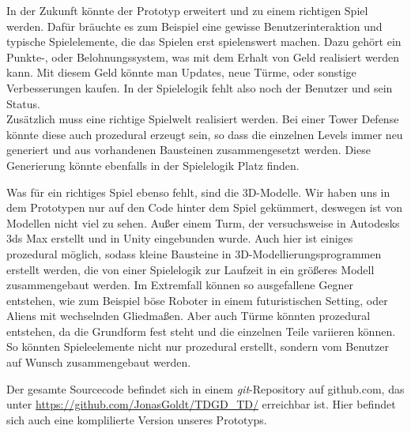 In der Zukunft könnte der Prototyp erweitert und zu einem richtigen Spiel werden. Dafür bräuchte es zum Beispiel eine gewisse Benutzerinteraktion und typische Spielelemente, die das Spielen erst spielenswert machen. Dazu gehört ein Punkte-, oder Belohnungssystem, was mit dem Erhalt von Geld realisiert werden kann. Mit diesem Geld könnte man Updates, neue Türme, oder sonstige Verbesserungen kaufen. In der Spielelogik fehlt also noch der Benutzer und sein Status.\\
Zusätzlich muss eine richtige Spielwelt realisiert werden. Bei einer Tower Defense könnte diese auch prozedural erzeugt sein, so dass die einzelnen Levels immer neu generiert und aus vorhandenen Bausteinen zusammengesetzt werden. Diese Generierung könnte ebenfalls in der Spielelogik Platz finden. 

Was für ein richtiges Spiel ebenso fehlt, sind die 3D-Modelle. Wir haben uns in dem Prototypen nur auf den Code hinter dem Spiel gekümmert, deswegen ist von Modellen nicht viel zu sehen. Außer einem Turm, der versuchsweise in Autodesks 3ds Max erstellt und in Unity eingebunden wurde. Auch hier ist einiges prozedural möglich, sodass kleine Bausteine in 3D-Modellierungsprogrammen erstellt werden, die von einer Spielelogik zur Laufzeit in ein größeres Modell zusammengebaut werden. Im Extremfall können so ausgefallene Gegner entstehen, wie zum Beispiel böse Roboter in einem futuristischen Setting, oder Aliens mit wechselnden Gliedmaßen. Aber auch Türme könnten prozedural entstehen, da die Grundform fest steht und die einzelnen Teile variieren können. So könnten Spieleelemente nicht nur prozedural erstellt, sondern vom Benutzer auf Wunsch zusammengebaut werden.

Der gesamte Sourcecode befindet sich in einem \textit{git}-Repository auf github.com, das unter \url{https://github.com/JonasGoldt/TDGD\_TD/} erreichbar ist. Hier befindet sich auch eine komplilierte Version unseres Prototyps.